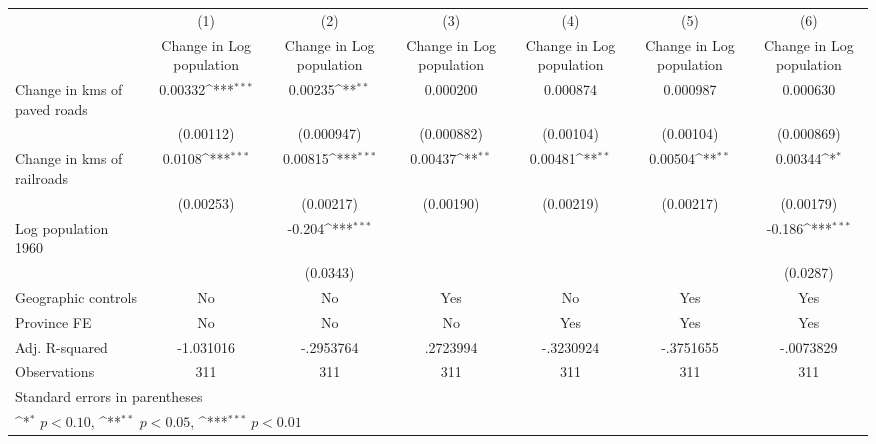 {
\def\sym#1{\ifmmode^{#1}\else\(^{#1}\)\fi}
\begin{tabular}{l*{6}{c}}
\hline\hline
                    &\multicolumn{1}{c}{(1)}&\multicolumn{1}{c}{(2)}&\multicolumn{1}{c}{(3)}&\multicolumn{1}{c}{(4)}&\multicolumn{1}{c}{(5)}&\multicolumn{1}{c}{(6)}\\
                    &\multicolumn{1}{c}{Change in Log population}&\multicolumn{1}{c}{Change in Log population}&\multicolumn{1}{c}{Change in Log population}&\multicolumn{1}{c}{Change in Log population}&\multicolumn{1}{c}{Change in Log population}&\multicolumn{1}{c}{Change in Log population}\\
\hline
Change in kms of paved roads&     0.00332\sym{***}&     0.00235\sym{**} &    0.000200         &    0.000874         &    0.000987         &    0.000630         \\
                    &   (0.00112)         &  (0.000947)         &  (0.000882)         &   (0.00104)         &   (0.00104)         &  (0.000869)         \\
[1em]
Change in kms of railroads&      0.0108\sym{***}&     0.00815\sym{***}&     0.00437\sym{**} &     0.00481\sym{**} &     0.00504\sym{**} &     0.00344\sym{*}  \\
                    &   (0.00253)         &   (0.00217)         &   (0.00190)         &   (0.00219)         &   (0.00217)         &   (0.00179)         \\
[1em]
Log population 1960 &                     &      -0.204\sym{***}&                     &                     &                     &      -0.186\sym{***}\\
                    &                     &    (0.0343)         &                     &                     &                     &    (0.0287)         \\
\hline
Geographic controls &          No         &          No         &         Yes         &          No         &         Yes         &         Yes         \\
Province FE         &          No         &          No         &          No         &         Yes         &         Yes         &         Yes         \\
Adj. R-squared      &   -1.031016         &   -.2953764         &    .2723994         &   -.3230924         &   -.3751655         &   -.0073829         \\
Observations        &         311         &         311         &         311         &         311         &         311         &         311         \\
\hline\hline
\multicolumn{7}{l}{\footnotesize Standard errors in parentheses}\\
\multicolumn{7}{l}{\footnotesize \sym{*} \(p<0.10\), \sym{**} \(p<0.05\), \sym{***} \(p<0.01\)}\\
\end{tabular}
}
